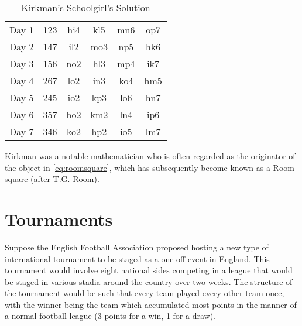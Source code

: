 \begin{table}[h!]
  \begin{center}
    \label{tab:kirkman-solution}
    \begin{tabular}{c|ccccc}
      Day 1 & 123 & hi4 & kl5 & mn6 & op7 \\
      Day 2 & 147 & il2 & mo3 & np5 & hk6 \\
      Day 3 & 156 & no2 & hl3 & mp4 & ik7 \\
      Day 4 & 267 & lo2 & in3 & ko4 & hm5 \\
      Day 5 & 245 & io2 & kp3 & lo6 & hn7 \\
      Day 6 & 357 & ho2 & km2 & ln4 & ip6 \\
      Day 7 & 346 & ko2 & hp2 & io5 & lm7
    \end{tabular}
  \end{center}
  \caption{Kirkman's Schoolgirl's Solution}
\end{table}

Kirkman was a notable mathematician who is often regarded as the originator of the object in \eqref{eq:roomsquare}, which has subsequently become known as a Room square (after T.G. Room).

\section{Tournaments}

Suppose the English Football Association proposed hosting a new type of international tournament to be staged as a one-off event in England.
This tournament would involve eight national sides competing in a league that would be staged in various stadia around the country over two weeks.
The structure of the tournament would be such that every team played every other team once, with the winner being the team which accumulated most points in the manner of a normal football league (3 points for a win, 1 for a draw).

